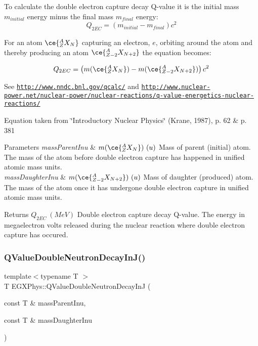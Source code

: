 To calculate the double electron capture decay Q-\/value it is the initial mass $m_{initial}$ energy minus the final mass $m_{final}$ energy\+: \[Q_{2EC} = \left ( m_{initial}-m_{final}\right ) c^2\]

For an atom $\ce{ ^{A}_{Z}X_{N} }$ capturing an electron, $e$, orbiting around the atom and thereby producing an atom $\ce{ ^{A}_{Z-2}X_{N{+2}} }$ the equation becomes\+:

\[Q_{2EC} = \left ( m(\ce{ ^{A}_{Z}X_{N} }) - m(\ce{ ^{A}_{Z-2}X_{N{+2}} }) \right ) c^2\]

See \href{http://www.nndc.bnl.gov/qcalc/}{\tt http\+://www.\+nndc.\+bnl.\+gov/qcalc/} and \href{http://www.nuclear-power.net/nuclear-power/nuclear-reactions/q-value-energetics-nuclear-reactions/}{\tt http\+://www.\+nuclear-\/power.\+net/nuclear-\/power/nuclear-\/reactions/q-\/value-\/energetics-\/nuclear-\/reactions/}

Equation taken from \char`\"{}\+Introductory Nuclear Physics\char`\"{} (Krane, 1987), p. 62 \& p. 381


\begin{DoxyParams}{Parameters}
{\em mass\+Parent\+Inu} & $m(\ce{ ^{A}_{Z}X_{N} })\ (u)$ Mass of parent (initial) atom. The mass of the atom before double electron capture has happened in unified atomic mass units. \\
\hline
{\em mass\+Daughter\+Inu} & $m(\ce{ ^{A}_{Z-2}X_{N{+2}} })\ (u)$ Mass of daughter (produced) atom. The mass of the atom once it has undergone double electron capture in unified atomic mass units. \\
\hline
\end{DoxyParams}
\begin{DoxyReturn}{Returns}
$Q_{2EC}\ (MeV)$ Double electron capture decay Q-\/value. The energy in megaelectron volts released during the nuclear reaction where double electron capture has occured. 
\end{DoxyReturn}
\mbox{\label{group___e_g_x_phys-_q_value_gada1ace2aa0a791df382f120767a56fe9}} 
\subsubsection{\texorpdfstring{Q\+Value\+Double\+Neutron\+Decay\+In\+J()}{QValueDoubleNeutronDecayInJ()}}
{\footnotesize\ttfamily template$<$typename T $>$ \\
T E\+G\+X\+Phys\+::\+Q\+Value\+Double\+Neutron\+Decay\+InJ (\begin{DoxyParamCaption}\item[{const T \&}]{mass\+Parent\+Inu,  }\item[{const T \&}]{mass\+Daughter\+Inu }\end{DoxyParamCaption})}



